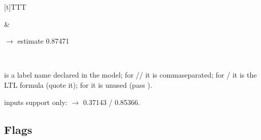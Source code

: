 \documentclass[a4paper,10pt,english]{sphinxmanual}
\begin{document}
\begin{savenotes}
\begin{tabulary}{\linewidth}[t]{TTT}
\begin{varwidth}[t]{}
\sphinxbeforeendvarwidth
\end{varwidth}%
&\begin{varwidth}[t]{}
\sphinxAtStartPar
{} \(\rightarrow\) estimate 0.87471
\sphinxbeforeendvarwidth
\end{varwidth}%
\\
\sphinxbottomrule
\end{tabulary}
\sphinxtableafterendhook\par
\sphinxattableend\end{savenotes}

\sphinxAtStartPar
{} is a label name declared in the model; for // it is
comma\sphinxhyphen{}separated; for / it is the LTL formula (quote it); for  it is
unused (pass \sphinxcode{\sphinxupquote{\sphinxhyphen{}}}).

\sphinxAtStartPar
{} inputs support  only:
 \(\rightarrow\) 0.37143 / 0.85366.


\subsection{Flags}
\label{\detokenize{manual/cli:flags}}
\end{document}
